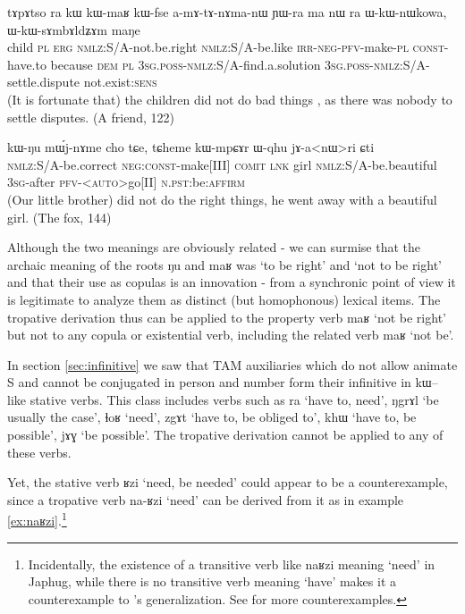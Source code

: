 \documentclass[oldfontcommands,oneside,a4paper,11pt]{article}
\newcommand{\ipa}[1]{{\phon \mbox{#1}}} %
\begin{document}
\begin{exe}
\ex \label{ex:kWmAR.amAtAnAmanW}
\gll
\ipa{tɤpɤtso} 	\ipa{ra} 	\ipa{kɯ} 	\ipa{kɯ-maʁ} 	\ipa{kɯ-fse} 	\ipa{a-mɤ-tɤ-nɤma-nɯ} 	\ipa{ɲɯ-ra} \ipa{ma}	\ipa{nɯ} \ipa{ra} 	\ipa{ɯ-kɯ-nɯkowa,} 	\ipa{ɯ-kɯ-sɤmbɤldʑɤm} 	\ipa{maŋe} 
  \\
child \textsc{pl} \textsc{erg} \textsc{nmlz}:S/A-not.be.right \textsc{nmlz}:S/A-be.like \textsc{irr-neg-pfv}-make-\textsc{pl} \textsc{const}-have.to because \textsc{dem} \textsc{pl} \textsc{3sg.poss-nmlz}:S/A-find.a.solution \textsc{3sg.poss-nmlz}:S/A-settle.dispute not.exist:\textsc{sens} \\
\glt (It is fortunate that) the children did not do bad things , as there was nobody to settle disputes. (A friend, 122)
\end{exe}
 
\begin{exe}
\ex \label{ex:kWNu.mWjnAme}
\gll
\ipa{kɯ-ŋu} 	\ipa{mɯ́j-nɤme} 	\ipa{cho} 	\ipa{tɕe,}  \ipa{tɕheme} 	\ipa{kɯ-mpɕɤr} 	\ipa{ɯ-qhu} 	\ipa{jɤ-a<nɯ>ri} 	\ipa{ɕti} \\
\textsc{nmlz}:S/A-be.correct \textsc{neg:const}-make[III] \textsc{comit} \textsc{lnk} girl \textsc{nmlz}:S/A-be.beautiful \textsc{3sg}-after \textsc{pfv}-<\textsc{auto}>go[II] \textsc{n.pst}:be:\textsc{affirm} \\
\glt (Our little brother) did not do the right things, he went away with a beautiful girl.  (The fox, 144)
\end{exe}
Although the two meanings are obviously related - we can surmise that the archaic meaning of the roots \ipa{ŋu} and \ipa{maʁ} was `to be right' and `not to be right' and that their use as copulas is an innovation - from a synchronic point of view it is legitimate to analyze them as   distinct (but homophonous) lexical items. The tropative derivation thus can be applied to the property verb \ipa{maʁ} `not be right' but not to any copula or existential verb, including the related verb \ipa{maʁ} `not be'.
 
 
 In section \ref{sec:infinitive} we saw that TAM auxiliaries which do not allow animate S and cannot be conjugated in person and number form their infinitive in \ipa{kɯ--} like stative verbs. This class includes verbs such as \ipa{ra} `have to, need', \ipa{ŋgrɤl} `be usually the case', \ipa{ɬoʁ} `need', \ipa{zgɤt} `have to, be obliged to', \ipa{khɯ} `have to, be possible', \ipa{jɤɣ} `be possible'. The tropative derivation cannot be applied to any of these verbs. 
 
 Yet, the stative verb  \ipa{ʁzi} `need, be needed' could appear to be a counterexample, since a tropative verb \ipa{na-ʁzi} `need' can be derived from it as in example \ref{ex:naʁzi}.\footnote{Incidentally, the existence of a transitive verb like \ipa{naʁzi} meaning `need' in Japhug, while there is no transitive verb meaning `have' makes it a counterexample to \citealt{harves12need}'s generalization. See \citet{antonov14need} for more counterexamples.}
\end{document}
